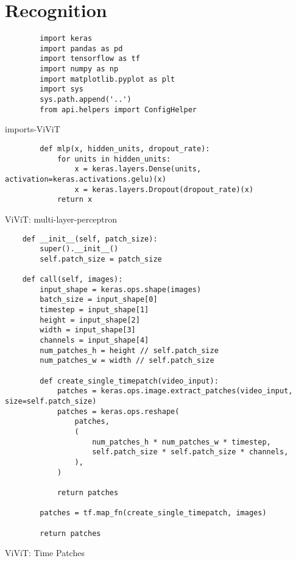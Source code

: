 \section{Recognition}
\label{sec:code-recognition}

\begin{listing}
    \begin{verbatim}
        import keras
        import pandas as pd
        import tensorflow as tf
        import numpy as np
        import matplotlib.pyplot as plt
        import sys
        sys.path.append('..')
        from api.helpers import ConfigHelper
    \end{verbatim}
    \caption[imports-ViViT]{imports-ViViT}
    \label{code:imports-ViViT}
\end{listing}


\begin{listing}
    \begin{verbatim}
        def mlp(x, hidden_units, dropout_rate):
            for units in hidden_units:
                x = keras.layers.Dense(units, activation=keras.activations.gelu)(x)
                x = keras.layers.Dropout(dropout_rate)(x)
            return x
    \end{verbatim}
    \caption[mlp layer]{ViViT: multi-layer-perceptron}
    \label{code:mlp-layer}
\end{listing}


\begin{listing}
    \begin{verbatim}
    def __init__(self, patch_size):
        super().__init__()
        self.patch_size = patch_size

    def call(self, images):
        input_shape = keras.ops.shape(images)
        batch_size = input_shape[0]
        timestep = input_shape[1]
        height = input_shape[2]
        width = input_shape[3]
        channels = input_shape[4]
        num_patches_h = height // self.patch_size
        num_patches_w = width // self.patch_size

        def create_single_timepatch(video_input):
            patches = keras.ops.image.extract_patches(video_input, size=self.patch_size)
            patches = keras.ops.reshape(
                patches,
                (
                    num_patches_h * num_patches_w * timestep,
                    self.patch_size * self.patch_size * channels,
                ),
            )

            return patches

        patches = tf.map_fn(create_single_timepatch, images)

        return patches

    \end{verbatim}
    \caption[time-patches]{ViViT: Time Patches}
    \label{code:timepatches}
\end{listing}


